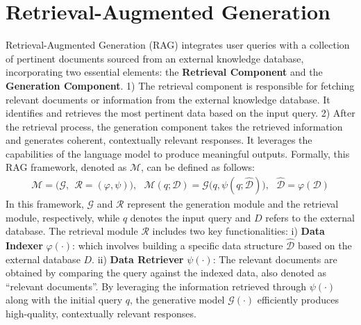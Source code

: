 \section{Retrieval-Augmented Generation}
\label{sec:model}
Retrieval-Augmented Generation (RAG) integrates user queries with a collection of pertinent documents sourced from an external knowledge database, incorporating two essential elements: the \textbf{Retrieval Component} and the \textbf{Generation Component}. 1) The retrieval component is responsible for fetching relevant documents or information from the external knowledge database. It identifies and retrieves the most pertinent data based on the input query. 2) After the retrieval process, the generation component takes the retrieved information and generates coherent, contextually relevant responses. It leverages the capabilities of the language model to produce meaningful outputs.
Formally, this RAG framework, denoted as $\mathcal{M}$, can be defined as follows:
\begin{align}
    \mathcal{M} = \Big( \mathcal{G}, ~~ \mathcal{R}=(\varphi, \psi) \Big),~~~
    \mathcal{M}(q; \mathcal{D}) = \mathcal{G}\Big(q, \psi(q; \hat{\mathcal{D}})\Big),~~~\hat{\mathcal{D}} = \varphi(\mathcal{D})
\end{align}
In this framework, $\mathcal{G}$ and $\mathcal{R}$ represent the generation module and the retrieval module, respectively, while $q$ denotes the input query and $D$ refers to the external database. The retrieval module $\mathcal{R}$ includes two key functionalities: i) \textbf{Data Indexer} $\varphi (\cdot)$: which involves building a specific data structure $\hat{\mathcal{D}}$ based on the external database $D$. ii) \textbf{Data Retriever} $\psi(\cdot)$: The relevant documents are obtained by comparing the query against the indexed data, also denoted as ``relevant documents''. By leveraging the information retrieved through $\psi(\cdot)$ along with the initial query $q$, the generative model $\mathcal{G}(\cdot)$ efficiently produces high-quality, contextually relevant responses.

